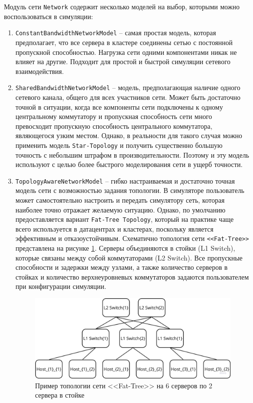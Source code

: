 Модуль сети \texttt{Network} содержит несколько моделей на выбор, которыми можно воспользоваться в симуляции:
\begin{enumerate}
    \item \texttt{ConstantBandwidthNetworkModel} -- самая простая модель, которая предполагает, что все сервера в кластере соединены сетью с постоянной пропускной способностью. Нагрузка сети одними компонентами никак не влияет на другие. Подходит для простой и быстрой симуляции сетевого взаимодействия.
    \item \texttt{SharedBandwidthNetworkModel} -- модель, предполагающая наличие одного сетевого канала, общего для всех участников сети. Может быть достаточно точной в ситуации, когда все компоненты сети подключены к одному центральному коммутатору и пропускная способность сети много превосходит пропускную способность центрального коммутатора, являющегося узким местом. Однако, в реальности для такого случая можно применить модель \texttt{Star-Topology} и получить существенно большую точность с небольшим штрафом в производительности. Поэтому и эту модель используют с целью более быстрого моделирования сети в ущерб точности. 
    \item \texttt{TopologyAwareNetworkModel} -- гибко настраиваемая и достаточно точная модель сети с возможностью задания топологии. В симуляторе пользователь может самостоятельно настроить и передать симулятору сеть, которая наиболее точно отражает желаемую ситуацию. Однако, по умолчанию предоставляется вариант \texttt{Fat-Tree Topology}, который на практике чаще всего используется в датацентрах и кластерах, поскольку является эффективным и отказоустойчивым\cite{fat-tree-networks-article}.  Схематично топология сети \texttt{<<Fat-Tree>>} представлена на рисунке \ref{fig:fat_tree_topology}. Серверы объединяются в стойки (L1 Switch), которые связаны между собой коммутаторами (L2 Switch). Все пропускные способности и задержки между узлами, а также количество серверов в стойках и количество верхнеуровневых коммутаторов задаются пользователем при конфигурации симуляции.
    
    \begin{figure}[h!]
        \centering
        \includegraphics[width=0.8\linewidth]{images/fat_tree_topology}
        \caption{Пример топологии сети <<Fat-Tree>> на 6 серверов по 2 сервера в стойке}
        \label{fig:fat_tree_topology}
    \end{figure}
\end{enumerate}


